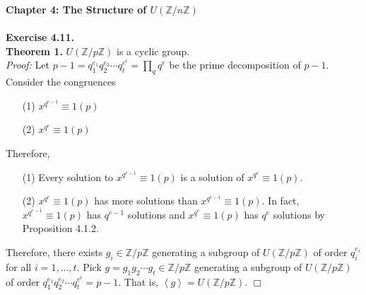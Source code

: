 \documentclass{article}
\begin{document}
\textbf{\Large Chapter 4: The Structure of $U(\mathbb{Z}/n\mathbb{Z})$} \\\\

\textbf{Exercise 4.11.} \\

\textbf{Theorem 1.} $U(\mathbb{Z}/p\mathbb{Z})$ is a cyclic group. \\

\emph{Proof:}
Let $p - 1 = q_1^{e_1} q_2^{e_2} \cdots q_t^{e^t} = \prod_{q} q^e$ be the prime
decomposition of $p - 1$. Consider the congruences

\begin{enumerate}
\item[(1)]
$x^{q^{e-1}} \equiv 1 (p)$
\item[(2)]
$x^{q^{e}} \equiv 1 (p)$
\end{enumerate}

Therefore,

\begin{enumerate}
\item[(1)]
Every solution to $x^{q^{e-1}} \equiv 1 (p)$ is a solution of $x^{q^{e}} \equiv 1 (p)$.
\item[(2)]
$x^{q^{e}} \equiv 1 (p)$ has more solutions than $x^{q^{e-1}} \equiv 1 (p)$.
In fact, $x^{q^{e-1}} \equiv 1 (p)$ has $q^{e-1}$ solutions and $x^{q^{e}} \equiv 1 (p)$
has $q^{e}$ solutions by Proposition 4.1.2.
\end{enumerate}

Therefore, there exists $g_i \in \mathbb{Z}/p\mathbb{Z}$ generating a subgroup of
$U(\mathbb{Z}/p\mathbb{Z})$ of order $q_i^{e_i}$ for all $i = 1, ..., t$.
Pick $g = g_1 g_2 \cdots g_t \in \mathbb{Z}/p\mathbb{Z}$ generating a subgroup of
$U(\mathbb{Z}/p\mathbb{Z})$ of order $q_1^{e_1} q_2^{e_2} \cdots q_t^{e^t} = p - 1$.
That is, $\left \langle g \right \rangle = U(\mathbb{Z}/p\mathbb{Z})$.
$\Box$
\end{document}
